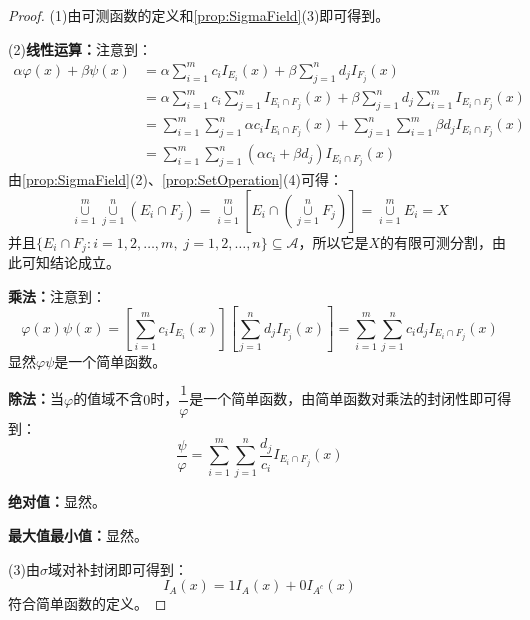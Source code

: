 \begin{proof}
	(1)由可测函数的定义和\cref{prop:SigmaField}(3)即可得到。\par
	(2)\textbf{线性运算：}注意到：
	\begin{align*}
		\alpha\varphi(x)+\beta\psi(x)
		&=\alpha\sum_{i=1}^{m}c_iI_{E_i}(x)+\beta\sum_{j=1}^{n}d_jI_{F_j}(x) \\
		&=\alpha\sum_{i=1}^{m}c_i\sum_{j=1}^{n}I_{E_i\cap F_j}(x)+\beta\sum_{j=1}^{n}d_j\sum_{i=1}^{m}I_{E_i\cap F_j}(x) \\
		&=\sum_{i=1}^{m}\sum_{j=1}^{n}\alpha c_iI_{E_i\cap F_j}(x)+\sum_{j=1}^{n}\sum_{i=1}^{m}\beta d_jI_{E_i\cap F_j}(x) \\
		&=\sum_{i=1}^{m}\sum_{j=1}^{n}(\alpha c_i+\beta d_j)I_{E_i\cap F_j}(x)
	\end{align*}
	由\cref{prop:SigmaField}(2)、\cref{prop:SetOperation}(4)可得：
	\begin{equation*}
		\underset{i=1}{\overset{m}{\cup}}\underset{j=1}{\overset{n}{\cup}}(E_i\cap F_j)=\underset{i=1}{\overset{m}{\cup}}\left[E_i\cap\left(\underset{j=1}{\overset{n}{\cup}}F_j\right)\right]=\underset{i=1}{\overset{m}{\cup}}E_i=X
	\end{equation*}
	并且$\{E_i\cap F_j:i=1,2,\dots,m,\;j=1,2,\dots,n\}\subseteq\mathscr{A}$，所以它是$X$的有限可测分割，由此可知结论成立。\par
	\textbf{乘法：}注意到：
	\begin{equation*}
		\varphi(x)\psi(x)=\left[\sum_{i=1}^{m}c_iI_{E_i}(x)\right]\left[\sum_{j=1}^{n}d_jI_{F_j}(x)\right]=\sum_{i=1}^{m}\sum_{j=1}^{n}c_id_jI_{E_i\cap F_j}(x)
	\end{equation*}
	显然$\varphi\psi$是一个简单函数。\par
	\textbf{除法：}当$\varphi$的值域不含$0$时，$\dfrac{1}{\varphi}$是一个简单函数，由简单函数对乘法的封闭性即可得到：
	\begin{equation*}
		\frac{\psi}{\varphi}=\sum_{i=1}^{m}\sum_{j=1}^{n}\frac{d_j}{c_i}I_{E_i\cap F_j}(x)
	\end{equation*}\par
	\textbf{绝对值：}显然。\par
	\textbf{最大值最小值：}显然。\par
	(3)由$\sigma$域对补封闭即可得到：
	\begin{equation*}
		I_A(x)=1I_A(x)+0I_{A^c}(x)
	\end{equation*}
	符合简单函数的定义。
\end{proof}
